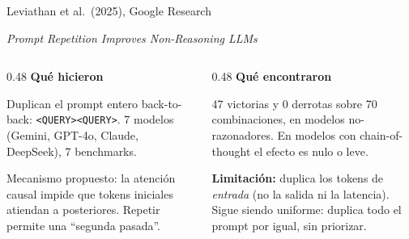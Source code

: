 \documentclass[aspectratio=169, 11pt]{beamer}
\begin{document}
\begin{frame}{Leviathan et al.\ (2025), Google Research}

\textit{Prompt Repetition Improves Non-Reasoning LLMs}

\vspace{0.6em}

\begin{columns}[T]
\begin{column}{0.48\textwidth}
\textbf{Qu\'e hicieron}

\vspace{0.3em}
\footnotesize
Duplican el prompt entero back-to-back: \texttt{<QUERY><QUERY>}. 7 modelos (Gemini, GPT-4o, Claude, DeepSeek), 7 benchmarks.

\vspace{0.5em}

Mecanismo propuesto: la atenci\'on causal impide que tokens iniciales atiendan a posteriores. Repetir permite una ``segunda pasada''.
\end{column}

\begin{column}{0.48\textwidth}
\textbf{Qu\'e encontraron}

\vspace{0.3em}
\footnotesize
\alert{47 victorias y 0 derrotas} sobre 70 combinaciones, en modelos no-razonadores. En modelos con chain-of-thought el efecto es nulo o leve.

\vspace{0.6em}

\textbf{Limitaci\'on:} duplica los tokens de \emph{entrada} (no la salida ni la latencia). Sigue siendo uniforme: duplica todo el prompt por igual, sin priorizar.
\end{column}
\end{columns}

\end{frame}
\end{document}
